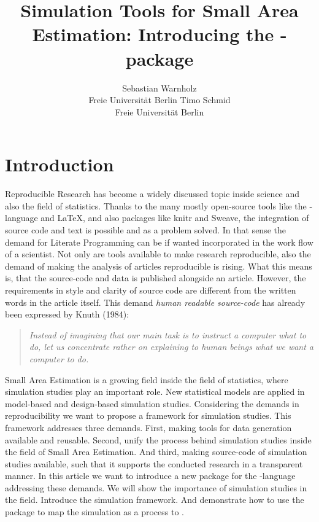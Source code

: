 \documentclass[article]{ajs}
\author{Sebastian Warnholz\\ Freie Universit\"at Berlin \And 
        Timo Schmid \\ Freie Universit\"at Berlin}
\title{Simulation Tools for Small Area Estimation: Introducing the \proglang{R}-package \proglang{saeSim}}
\begin{document}
%
%
%
\section{Introduction}
Reproducible Research has become a widely discussed topic inside science and also the field of statistics. Thanks to the many mostly open-source tools like the -language and \LaTeX, and also packages like knitr and Sweave, the integration of source code and text is possible and as a problem solved. In that sense the demand for Literate Programming can be if wanted incorporated in the work flow of a scientist. Not only are tools available to make research reproducible, also the demand of making the analysis of articles reproducible is rising. What this means is, that the source-code and data is published alongside an article. However, the requirements in style and clarity of source code are different from the written words in the article itself. This demand \textit{human readable source-code} has already been expressed by Knuth (1984): 
\begin{quote}
\textit{Instead of imagining that our main task is to instruct a computer what to do, let us concentrate rather on explaining to human beings what we want a computer to do.}
\end{quote}
Small Area Estimation is a growing field inside the field of statistics, where simulation studies play an important role. New statistical models are applied in model-based and design-based simulation studies. Considering the demands in reproducibility we want to propose a framework for simulation studies. This framework addresses three demands. First, making tools for data generation available and reusable. Second, unify the process behind simulation studies inside the field of Small Area Estimation. And third, making source-code of simulation studies available, such that it supports the conducted research in a transparent manner.
In this article we want to introduce a new package for the -language addressing these demands. We will show the importance of simulation studies in the field. Introduce the simulation framework. And demonstrate how to use the package to map the simulation as a process to .
\end{document}
